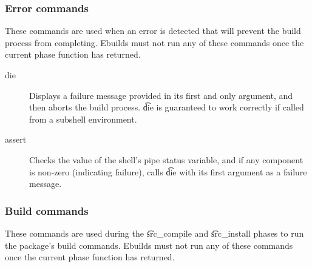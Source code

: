 \subsubsection{Error commands}
These commands are used when an error is detected that will prevent the build process from
completing. Ebuilds must not run any of these commands once the current phase function has returned.
\begin{description}
\item[die] Displays a failure message provided in its first and only argument, and then aborts the
    build process. \t{die} is  guaranteed to work correctly if called from a subshell
    environment.
\item[assert] Checks the value of the shell's pipe status variable, and if any component is non-zero
    (indicating failure), calls \t{die} with its first argument as a failure message.
\end{description}

\subsubsection{Build commands}
These commands are used during the \t{src\_compile} and \t{src\_install} phases to run the
package's build commands. Ebuilds must not run any of these commands once the current phase function
has returned.

